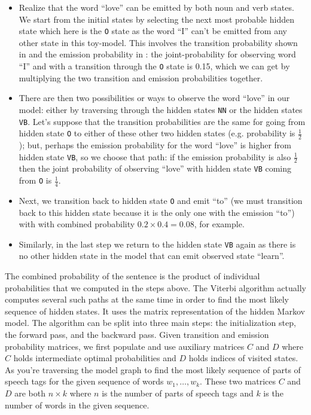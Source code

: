 \documentclass[12pt]{article}
\begin{document}
\vspace{-10pt}
\begin{itemize}
  \item Realize that the word ``love'' can be emitted by both noun and verb states. We start from the initial states by selecting the next most probable hidden state which here is the \texttt{O} state as the word ``I'' can't be emitted from any other state in this toy-model. This involves the transition probability shown in {\color{green!80!black}{green}} and the emission probability in {\color{orange!80!black}{orange}}: the joint-probability for observing word ``I'' and with a transition through the \texttt{O} state is 0.15, which we can get by multiplying the two transition and emission probabilities together.
  \item There are then two possibilities or ways to observe the word ``love'' in our model: either by traversing through the hidden states \texttt{NN} or the hidden states \texttt{VB}. Let's suppose that the transition probabilities are the same for going from hidden state \texttt{O} to either of these other two hidden states (e.g. probability is $\frac{1}{2}$); but, perhaps the emission probability for the word ``love'' is higher from hidden state \texttt{VB}, so we choose that path: if the emission probability is also $\frac{1}{2}$ then the joint probability of observing ``love'' with hidden state \texttt{VB} coming from \texttt{O} is $\frac{1}{4}$.
  \item Next, we transition back to hidden state \texttt{O} and emit ``to'' (we must transition back to this hidden state because it is the only one with the emission ``to'') with with combined probability $0.2 \times 0.4 = 0.08$, for example.
  \item Similarly, in the last step we return to the hidden state \texttt{VB} again as there is no other hidden state in the model that can emit observed state ``learn''. 
\end{itemize}

The combined probability of the sentence is the product of individual probabilities that we computed in the steps above. The Viterbi algorithm actually computes several such paths at the same time in order to find the most likely sequence of hidden states. It uses the matrix representation of the hidden Markov model. The algorithm can be split into three main steps: the initialization step, the forward pass, and the backward pass.
Given transition and emission probability matrices, we first populate and use auxiliary matrices $C$ and $D$ where $C$ holds intermediate optimal probabilities and $D$ holds indices of visited states.
As you're traversing the model graph to find the most likely sequence of   parts of speech tags for the given sequence of words $w_1, \ldots, w_k$.
These two matrices $C$ and $D$ are both $n \times k$ where $n$ is the number of parts of speech tags and $k$ is the number of words in the given sequence.
\end{document}

